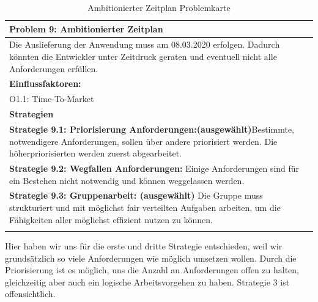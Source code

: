 \documentclass[enabledeprecatedfontcommands,fontsize=12pt,paper=a4,twoside]{scrartcl}
\begin{document}
\begin{table}[H]
    \centering
    \begin{tabular}{|p{15cm}|}
    \hline
          \textbf{Problem 9:} Ambitionierter Zeitplan
          \\ \hline
          Die Auslieferung der Anwendung muss am 08.03.2020 erfolgen. Dadurch könnten die Entwickler unter Zeitdruck geraten und eventuell nicht alle Anforderungen erfüllen.
          \\ \hline
          \textbf{Einflussfaktoren: } \\
          O1.1: Time-To-Market\\
          \hline
          \textbf{Strategien} \\ \hline

         \textbf{Strategie 9.1: Priorisierung Anforderungen:(ausgewählt)}Bestimmte, notwendigere Anforderungen, sollen über andere priorisiert werden. Die höherpriorisierten werden zuerst abgearbeitet. \\
          \textbf{Strategie 9.2: Wegfallen Anforderungen:} Einige Anforderungen sind für ein Bestehen nicht notwendig und können weggelassen werden.\\
          \textbf{Strategie 9.3: Gruppenarbeit: (ausgewählt)} Die Gruppe muss strukturiert und mit möglichst fair verteilten Aufgaben arbeiten, um die Fähigkeiten aller möglichst effizient nutzen zu können. \\
          \\ \hline
    \end{tabular}
    \caption{Ambitionierter Zeitplan Problemkarte}
    \label{tab:ProblemKarte9}
\end{table}
Hier haben wir uns für die erste und dritte Strategie entschieden, weil wir grundsätzlich so viele Anforderungen wie möglich umsetzen wollen. Durch die Priorisierung ist es möglich, uns die Anzahl an Anforderungen offen zu halten, gleichzeitig aber auch ein logische Arbeitsvorgehen zu haben. Strategie 3 ist offensichtlich. \\
\end{document}
